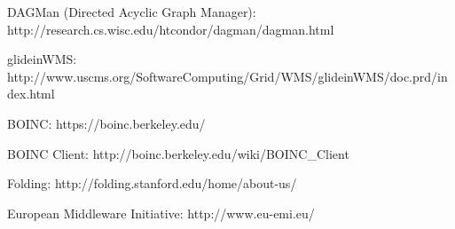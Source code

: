 \begin{thebibliography}{99}
 DAGMan (Directed Acyclic Graph Manager): http://research.cs.wisc.edu/htcondor/dagman/dagman.html

 glideinWMS: http://www.uscms.org/SoftwareComputing/Grid/WMS/glideinWMS/doc.prd/index.html

 BOINC: https://boinc.berkeley.edu/

 BOINC Client: http://boinc.berkeley.edu/wiki/BOINC\_Client

 Folding: http://folding.stanford.edu/home/about-us/

 European Middleware Initiative: http://www.eu-emi.eu/
\end{thebibliography}
